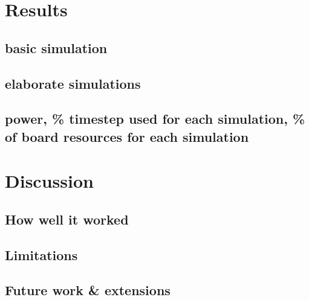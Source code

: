 \documentclass[english]{article}
\begin{document}
\section{Results}

\subsection{basic simulation}

\subsection{elaborate simulations}

\subsection{power, \% timestep used for each simulation, \% of board resources for each simulation}

\section{Discussion}

\subsection{How well it worked}

\subsection{Limitations}

\subsection{Future work \& extensions}
\end{document}
